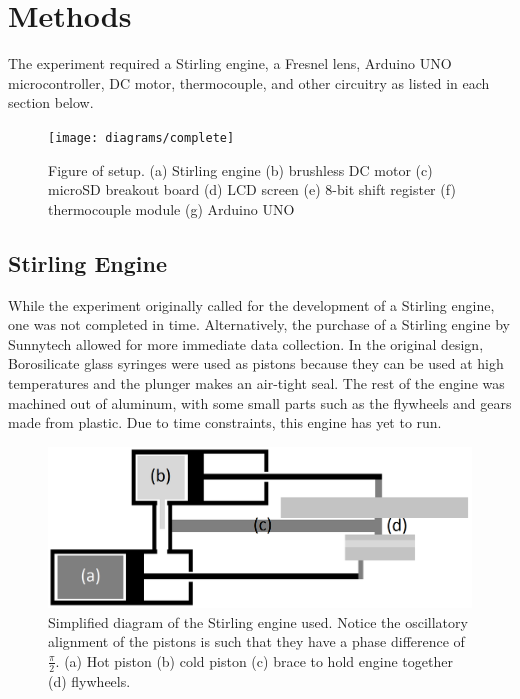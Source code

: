 \chapter{Methods}
The experiment required a Stirling engine, a Fresnel lens, Arduino UNO microcontroller, DC motor, thermocouple, and other circuitry as listed in each section below.

\begin{figure}[ht]
    \centering
    \texttt{[image: diagrams/complete]}
    \caption[Experimental setup]{Figure of setup. (a) Stirling engine (b) brushless DC motor (c) microSD breakout board (d) LCD screen (e) 8-bit shift register (f) thermocouple module (g) Arduino UNO}
    \label{fig:setup}
\end{figure}

\section{Stirling Engine}

    While the experiment originally called for the development of a Stirling engine, one was not completed in time. Alternatively, the purchase of a Stirling engine by Sunnytech allowed for more immediate data collection. In the original design, Borosilicate glass syringes were used as pistons because they can be used at high temperatures and the plunger makes an air-tight seal. The rest of the engine was machined out of aluminum, with some small parts such as the flywheels and gears made from plastic. Due to time constraints, this engine has yet to run.
    
    \begin{figure}[H]
        \centering
        \includegraphics[width=\textwidth]{diagrams/stirling2}
        \caption[Stirling engine]{Simplified diagram of the Stirling engine used. Notice the oscillatory alignment of the pistons is such that they have a phase difference of \(\frac{\pi}{2}\). (a) Hot piston (b) cold piston (c) brace to hold engine together (d) flywheels.}
        \label{fig:stirling}
    \end{figure}

